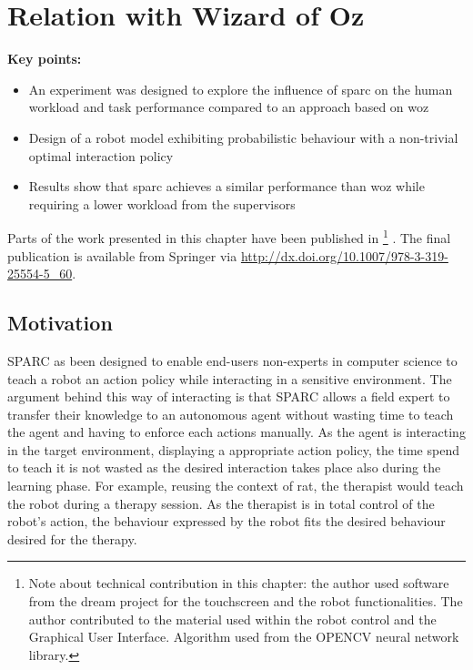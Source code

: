 \chapter{Relation with Wizard of Oz}\label{chap:woz}
\begin{framed}
	\textbf{Key points:}
	
	\begin{itemize}
		\item An experiment was designed to explore the influence of \gls{sparc} on the human workload and task performance compared to an approach based on \gls{woz}
		\item Design of a robot model exhibiting probabilistic behaviour with a non-trivial optimal interaction policy
		\item Results show that \gls{sparc} achieves a similar performance than \gls{woz} while requiring a lower workload from the supervisors
	\end{itemize}
\end{framed}

Parts of the work presented in this chapter have been published in \cite{senft2015sparc} \footnote{Note about technical contribution in this chapter: the author used software from the \gls{dream} project for the touchscreen and the robot functionalities. The author contributed to the material used within the robot control and the Graphical User Interface. Algorithm used from the OPENCV neural network library.} . The final publication is available from Springer via \url{http://dx.doi.org/10.1007/978-3-319-25554-5_60}.

\newpage

\section{Motivation}

SPARC as been designed to enable end-users non-experts in computer science to teach a robot an action policy while interacting in a sensitive environment. The argument behind this way of interacting is that SPARC allows a field expert to transfer their knowledge to an autonomous agent without wasting time to teach the agent and having to enforce each actions manually. As the agent is interacting in the target environment, displaying a appropriate action policy, the time spend to teach it is not wasted as the desired interaction takes place also during the learning phase. For example, reusing the context of \gls{rat}, the therapist would teach the robot during a therapy session. As the therapist is in total control of the robot's action, the behaviour expressed by the robot fits the desired behaviour desired for the therapy.

